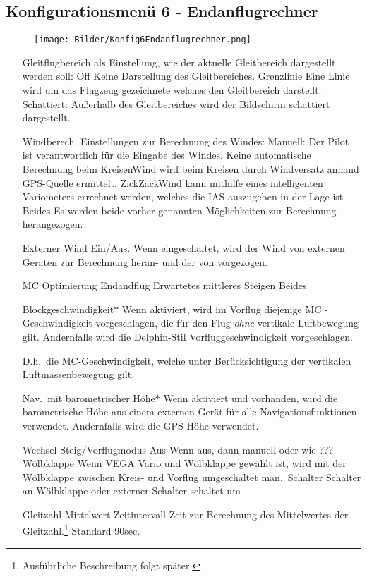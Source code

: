 \subsection{Konfigurationsmenü 6 - Endanflugrechner}\label{Konfig6}
\begin{wrapfigure}{r}{5.2cm}
\texttt{[image: Bilder/Konfig6Endanflugrechner.png]}
\end{wrapfigure}
\begin{enumerate}
\item[Gleitflugbereich als] Einstellung, wie der aktuelle Gleitbereich dargestellt werden soll: \textsf{Off} Keine Darstellung des Gleitbereiches. \textsf{Grenzlinie} Eine Linie wird um das Flugzeug gezeichnete welches den Gleitbereich darstellt. \textsf{Schattiert}: Außerhalb des Gleitbereiches wird der Bildschirm schattiert dargestellt.
\item[Windberech.]Einstellungen zur Berechnung des Windes: \textsf{ Manuell}: Der Pilot ist verantwortlich für die Eingabe des Windes. Keine automatische Berechnung \textsf{ beim Kreisen}Wind wird beim Kreisen durch Windversatz anhand GPS-Quelle ermittelt. \textsf{ZickZack}Wind kann  mithilfe eines intelligenten Variometers  errechnet werden, welches die IAS auszugeben in der Lage ist \textsf{Beides} Es werden beide vorher genannten Möglichkeiten zur Berechnung herangezogen.
\item[Externer Wind] Ein/Aus. Wenn eingeschaltet, wird der Wind von externen Geräten zur Berechnung heran- und der von \xc vorgezogen.
\item[MC Optimierung]\textsf{Endandflug} \textsf{Erwartetes mittleres Steigen} \textsf{Beides}
\item[Blockgeschwindigkeit$\ast$] Wenn aktiviert, wird im
Vorflug diejenige \textsf{MC} - Geschwindigkeit vorgeschlagen,  die für den Flug \textsl{ohne} vertikale Luftbewegung gilt. Andernfalls wird die \textsf{Delphin-Stil} Vorfluggeschwindigkeit vorgeschlagen.

    D.h.\ die \textsf{MC}-Geschwindigkeit, welche unter Berücksichtigung der vertikalen Luftmassenbewegung gilt.
\item[Nav.\ mit barometrischer Höhe$\ast$] Wenn aktiviert und vorhanden, wird die barometrische Höhe aus einem externen Gerät für alle Navigationsfunktionen verwendet.  Andernfalls wird die \textsf{GPS}-Höhe verwendet.
\item[Wechsel Steig/Vorflugmodus] \textsf{Aus} Wenn aus, dann manuell oder wie ???  \textsf{Wölbklappe} Wenn VEGA Vario und Wölbklappe gewählt ist, wird mit der Wölbklappe zwischen Kreis- und Vorflug umgeschaltet  \textsf{ man.\ Schalter} Schalter an Wölbklappe oder externer Schalter schaltet um\stop
\item[Gleitzahl Mittelwert-Zeitintervall]Zeit zur Berechnung des Mittelwertes der Gleitzahl.\footnote{Ausführliche  Beschreibung folgt später.} Standard 90sec.\
\end{enumerate}

